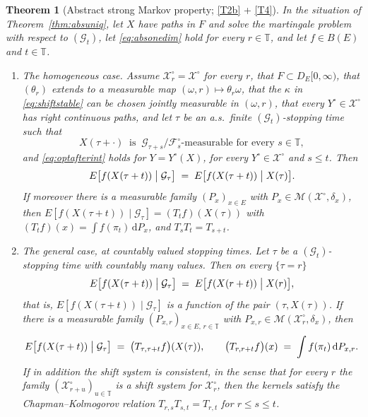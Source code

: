 \documentclass[11pt,a4paper]{article}
\theoremstyle{plain}
\newtheorem{theorem}{Theorem}[section]
\theoremstyle{definition}
\theoremstyle{remark}
\newcommand{\T}{\mathbb{T}}                     %
\newcommand{\Bdd}{B}                           %
\newcommand{\DE}{D_E[0,\infty)}
\newcommand{\Filt}{\mathcal{F}}
\newcommand{\Gilt}{\mathcal{G}}
\newcommand{\XX}{\mathcal{X}}                  %
\newcommand{\Msol}{\mathcal{M}}
\newcommand{\dif}{\,\mathrm{d}}
\begin{document}
\begin{theorem}[Abstract strong Markov property; \eqref{T2b} + \eqref{T4}]
  \label{thm:absstrongmarkov}
  In the situation of Theorem~\ref{thm:absuniq}, let $X$ have paths in $F$ and
  solve the martingale problem with respect to $(\Gilt_t)$, let \eqref{eq:absonedim}
  hold for every $r \in \T$, and let $f \in \Bdd(E)$ and $t \in \T$.
  \begin{enumerate}[label=(\alph*)]
  \item \label{it:asm_hom}
    \emph{The homogeneous case.}  Assume $\XX^\circ_r = \XX^\circ$ for every $r$,
    that $F \subset \DE$, that $(\theta_r)$ extends to a measurable map
    $(\omega,r) \mapsto \theta_r\omega$, that the $\kappa$ in
    \eqref{eq:shiftstable} can be chosen jointly measurable in $(\omega,r)$, that
    every $Y^\circ \in \XX^\circ$ has right continuous paths, and let $\tau$ be an
    a.s.\ finite $(\Gilt_t)$-stopping time such that
    \begin{equation}
      \label{eq:shiftadapt}
      X(\tau+\cdot) \ \text{ is } \ \Gilt_{\tau+s}/\Filt^\circ_s\text{-measurable
      for every } s \in \T ,
    \end{equation}
    and \eqref{eq:optafterint} holds for $Y = Y^\circ(X)$, for every
    $Y^\circ \in \XX^\circ$ and $s \leq t$.  Then
    \[
      E\bigl[ f(X(\tau+t)) \bigm| \Gilt_\tau \bigr]
        \;=\; E\bigl[ f(X(\tau+t)) \bigm| X(\tau) \bigr] .
    \]
    If moreover there is a measurable family $(P_x)_{x \in E}$ with
    $P_x \in \Msol(\XX^\circ,\delta_x)$, then
    $E[ f(X(\tau+t)) \mid \Gilt_\tau ] = (T_t f)(X(\tau))$ with
    $(T_t f)(x) = \int f(\pi_t) \dif P_x$, and $T_s T_t = T_{s+t}$.
  \item \label{it:asm_inhom}
    \emph{The general case, at countably valued stopping times.}  Let $\tau$ be a
    $(\Gilt_t)$-stopping time with countably many values.  Then on every
    $\{\tau = r\}$
    \[
      E\bigl[ f(X(\tau+t)) \bigm| \Gilt_\tau \bigr]
        \;=\; E\bigl[ f(X(r+t)) \bigm| X(r) \bigr] ,
    \]
    that is, $E[ f(X(\tau+t)) \mid \Gilt_\tau ]$ is a function of the pair
    $(\tau, X(\tau))$.  If there is a measurable family
    $(P_{x,r})_{x \in E,\, r \in \T}$ with $P_{x,r} \in \Msol(\XX^\circ_r,\delta_x)$,
    then
    \[
      E\bigl[ f(X(\tau+t)) \bigm| \Gilt_\tau \bigr] \;=\;
        \bigl( T_{\tau,\tau+t} f \bigr)(X(\tau)) ,
      \qquad
      \bigl( T_{r,r+t} f \bigr)(x) \;=\; \int f(\pi_t) \dif P_{x,r} .
    \]
    If in addition the shift system is \emph{consistent}, in the sense that for
    every $r$ the family $(\XX^\circ_{r+u})_{u \in \T}$ is a shift system for
    $\XX^\circ_r$, then the kernels satisfy the Chapman--Kolmogorov relation
    $T_{r,s} T_{s,t} = T_{r,t}$ for $r \leq s \leq t$.
  \end{enumerate}
\end{theorem}
\end{document}
